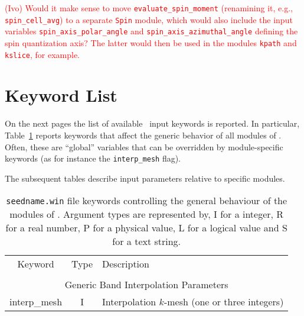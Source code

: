 \textcolor{red}{(Ivo) Would it make sense to move
  \texttt{evaluate\_spin\_moment} (renamining it, e.g.,
  \texttt{spin\_cell\_avg}) to a separate \texttt{Spin} module, which
  would also include the input variables
  \texttt{spin\_axis\_polar\_angle} and
  \texttt{spin\_axis\_azimuthal\_angle} defining the spin quantization
  axis? The latter would then be used in the modules \texttt{kpath}
  and \texttt{kslice}, for example.}

\section{Keyword List}
On the next pages the list of available
\postw\ input keywords is reported.
In particular, Table~\ref{parameter_keywords_postw90} reports keywords
that affect the generic behavior of all modules of
\postw. Often, these are ``global'' variables that can be overridden
by module-specific keywords (as for instance the {\tt interp\_mesh} flag).

The subsequent tables describe input parameters relative to specific modules.

\clearpage

\begin{table}[hH!]
\begin{center}
\begin{tabular}{|c|c|p{6cm}|}
\hline
Keyword & Type & Description \\
        &      &             \\
\hline\hline
\multicolumn{3}{|c|}{Generic Band Interpolation Parameters} \\
\hline
{\sc interp\_mesh}   & I & Interpolation $k$-mesh (one or three integers) \\
\hline
\end{tabular}
\caption[Parameter file keywords controlling \postw.]
{{\tt seedname.win} file keywords controlling the general behaviour of
  the modules of \postw. Argument types
are represented by, I for a integer, R for a real number, P for a
physical value, L for a logical value and S for a text string.}
\label{parameter_keywords_postw90}
\end{center}
\end{table}


